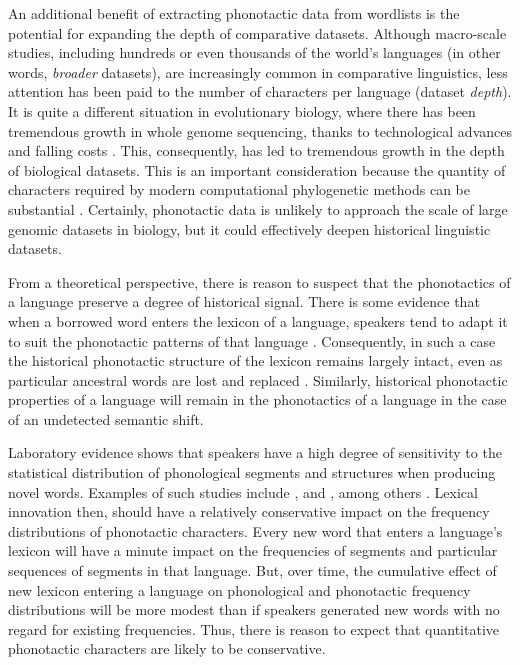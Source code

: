 An additional benefit of extracting phonotactic data from wordlists is the potential for expanding the depth of comparative datasets. Although macro-scale studies, including hundreds or even thousands of the world's languages (in other words, \emph{broader} datasets), are increasingly common in comparative linguistics, less attention has been paid to the number of characters per language (dataset \emph{depth}). It is quite a different situation in evolutionary biology, where there has been tremendous growth in whole genome sequencing, thanks to technological advances and falling costs \autocites{delsuc_phylogenomics_2005}{wortley_how_2005}. This, consequently, has led to tremendous growth in the depth of biological datasets. This is an important consideration because the quantity of characters required by modern computational phylogenetic methods can be substantial \autocites{wortley_how_2005}{marin_undersampling_2018}. Certainly, phonotactic data is unlikely to approach the scale of large genomic datasets in biology, but it could effectively deepen historical linguistic datasets.

From a theoretical perspective, there is reason to suspect that the phonotactics of a language preserve a degree of historical signal. There is some evidence that when a borrowed word enters the lexicon of a language, speakers tend to adapt it to suit the phonotactic patterns of that language \autocites{hyman_role_1970}{silverman_multiple_1992}{crawford_adaptation_2009}{kang_loanword_2011}. Consequently, in such a case the historical phonotactic structure of the lexicon remains largely intact, even as particular ancestral words are lost and replaced \autocite[a property termed \emph{pertinacity} by][]{dresher_main_2005}. Similarly, historical phonotactic properties of a language will remain in the phonotactics of a language in the case of an undetected semantic shift.

Laboratory evidence shows that speakers have a high degree of sensitivity to the statistical distribution of phonological segments and structures when producing novel words. Examples of such studies include \textcite{coleman_stochastic_1997}, \textcite{albright_rules_2003} and \textcite{hayes_stochastic_2006}, among others \autocite[see][pp.~20--21]{gordon_phonological_2016}. Lexical innovation then, should have a relatively conservative impact on the frequency distributions of phonotactic characters. Every new word that enters a language's lexicon will have a minute impact on the frequencies of segments and particular sequences of segments in that language. But, over time, the cumulative effect of new lexicon entering a language on phonological and phonotactic frequency distributions will be more modest than if speakers generated new words with no regard for existing frequencies. Thus, there is reason to expect that quantitative phonotactic characters are likely to be conservative.

